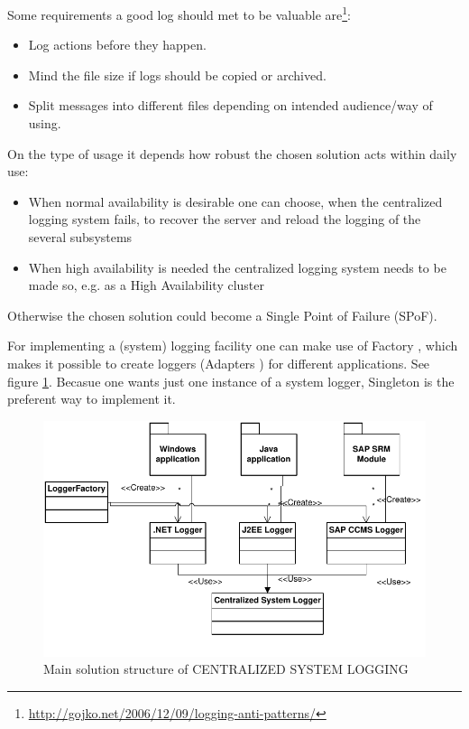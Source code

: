 Some requirements a good log should met to be valuable are\footnote{\url{http://gojko.net/2006/12/09/logging-anti-patterns/}}:
\begin{itemize}
	\item Log actions before they happen.
	\item Mind the file size if logs should be copied or archived.
	\item Split messages into different files depending on intended audience/way of using.
\end{itemize}

On the type of usage it depends how robust the chosen solution acts within daily use:
\begin{itemize}
	\item When normal availability is desirable one can choose, when the  centralized logging system fails, to recover the server and reload the logging of the several subsystems
	\item When high availability is needed the centralized logging system needs to be made so, e.g. as a High Availability cluster
\end{itemize}
Otherwise the chosen solution could become a Single Point of Failure (SPoF).

For implementing a (system) logging facility one can make use of {\sc  Factory} \cite{Gamma95}, which makes it possible to create loggers ({\sc  Adapters} \cite{Gamma95}) for different applications. See figure \ref{fig:systemLogging}. Becasue one wants just one instance of a system logger, {\sc  Singleton} \cite{Gamma95} is the preferent way to implement it.

\begin{figure}[h]
\centering
\includegraphics{patterns/systemLoggingDiagram.pdf}
\caption{Main solution structure of CENTRALIZED SYSTEM LOGGING}
\label{fig:systemLogging}
\end{figure}

